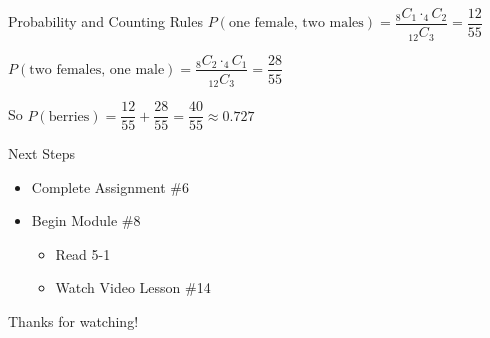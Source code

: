 \documentclass[t, aspectratio=169]{beamer}
\newcommand{\?}{\stackrel{?}{=}}
\begin{document}
	\begin{frame}{Probability and Counting Rules}
		$P(\text{one female, two males}) = \dfrac{_8 C _1 \cdot _4 C _2}{_{12} C _3} = \dfrac{12}{55}$ \pause
		
		$P(\text{two females, one male}) = \dfrac{_8 C _2 \cdot _4 C _1}{_{12} C _3} = \dfrac{28}{55}$ \pause
		
		So $P(\text{berries}) = \dfrac{12}{55} + \dfrac{28}{55} = \dfrac{40}{55} \approx 0.727$
	\end{frame}

	\begin{frame}{Next Steps}
		\begin{itemize}
			\item Complete Assignment \#6
			\item Begin Module \#8 \begin{itemize}
				\item Read 5-1
				\item Watch Video Lesson \#14
			\end{itemize}
		\end{itemize}
	
		\vfill
		
		Thanks for watching!
	\end{frame}
	
\end{document}
